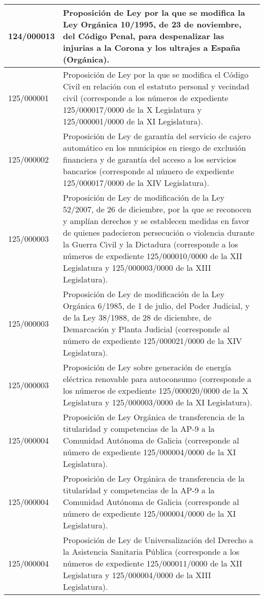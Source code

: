 {\begin{table}[H]
\begin{center}
\begin{tabularx}{\linewidth}{| l | X |}
\hline
124/000013 & Proposición de Ley por la que se modifica la Ley Orgánica 10/1995, de 23 de noviembre, del Código Penal, para despenalizar las injurias a la Corona y los ultrajes a España (Orgánica). \\
\hline
125/000001 & Proposición de Ley por la que se modifica el Código Civil en relación con el estatuto personal y vecindad civil (corresponde a los números de expediente 125/000017/0000 de la X Legislatura y 125/000001/0000 de la XI Legislatura). \\
\hline
125/000002 & Proposición de Ley de garantía del servicio de cajero automático en los municipios en riesgo de exclusión financiera y de garantía del acceso a los servicios bancarios (corresponde al número de expediente 125/000017/0000 de la XIV Legislatura). \\
\hline
125/000003 & Proposición de Ley de modificación de la Ley 52/2007, de 26 de diciembre, por la que se reconocen y amplían derechos y se establecen medidas en favor de quienes padecieron persecución o violencia durante la Guerra Civil y la Dictadura (corresponde a los números de expediente 125/000010/0000 de la XII Legislatura y 125/000003/0000 de la XIII Legislatura). \\
\hline
125/000003 & Proposición de Ley de modificación de la Ley Orgánica 6/1985, de 1 de julio, del Poder Judicial, y de la Ley 38/1988, de 28 de diciembre, de Demarcación y Planta Judicial (corresponde al número de expediente 125/000021/0000 de la XIV Legislatura). \\
\hline
125/000003 & Proposición de Ley sobre generación de energía eléctrica renovable para autoconsumo (corresponde a los números de expediente 125/000020/0000 de la X Legislatura y 125/000003/0000 de la XI Legislatura). \\
\hline
125/000004 & Proposición de Ley Orgánica de transferencia de la titularidad y competencias de la AP-9 a la Comunidad Autónoma de Galicia (corresponde al número de expediente 125/000004/0000 de la XI Legislatura). \\
\hline
125/000004 & Proposición de Ley Orgánica de transferencia de la titularidad y competencias de la AP-9 a la Comunidad Autónoma de Galicia (corresponde al número de expediente 125/000004/0000 de la XI Legislatura). \\
\hline
125/000004 & Proposición de Ley de Universalización del Derecho a la Asistencia Sanitaria Pública (corresponde a los números de expediente 125/000011/0000 de la XII Legislatura y 125/000004/0000 de la XIII Legislatura). \\

\end{tabularx}
\end{center}
\end{table}}

